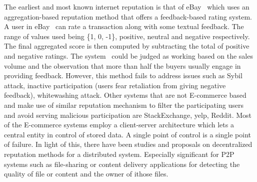The earliest and most known internet reputation is that of
eBay~\cite{resnick2002trust} which uses an aggregation-based reputation method
that offers a feedback-based rating system. A user in
eBay~\cite{resnick2006value} can rate a transaction along with some textual
feedback. The range of values used being \{1, 0, -1\}, positive, neutral and
negative respectively. The final aggregated score is then computed by
subtracting the total of positive and negative ratings. The
system~\cite{resnick2006value} could be judged as working based on the sales
volume and the observation that more than half the buyers usually engage in
providing feedback. However, this method fails to address issues such as Sybil
attack, inactive participation (users fear retaliation from giving negative
feedback), whitewashing attack. Other systems that are not E-commerce based and
make use of similar reputation mechanism to filter the participating users and
avoid serving malicious participation are StackExchange, yelp, Reddit. Most of
the E-commerce systems employ a client-server architecture which lets a central
entity in control of stored data. A single point of control is a single point
of failure. In light of this, there have been studies and proposals on
decentralized reputation methods for a distributed system. Especially
significant for P2P systems such as file-sharing or content delivery
applications for detecting the quality of file or content and the owner of
ithose files. \par   

